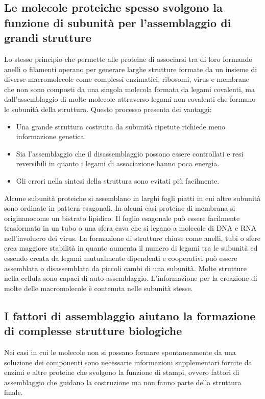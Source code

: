 \subsection{Le molecole proteiche spesso svolgono la funzione di subunit\`a per l'assemblaggio di grandi strutture}
Lo stesso principio che permette alle proteine di associarsi tra di loro formando anelli o filamenti operano per generare larghe strutture formate da un insieme di diverse macromolecole
come complessi enzimatici, ribosomi, virus e membrane che non sono composti da una singola molecola formata da legami covalenti, ma dall'assemblaggio di molte molecole attraverso legami
non covalenti che formano le subunit\`a della struttura. Questo processo presenta dei vantaggi:
\begin{itemize}
	\item Una grande struttura costruita da subunit\`a ripetute richiede meno informazione genetica.
	\item Sia l'assemblaggio che il disassemblaggio possono essere controllati e resi reversibili in quanto i legami di associazione hanno poca energia.
	\item Gli errori nella sintesi della struttura sono evitati pi\`u facilmente. 
\end{itemize}
Alcune subunit\`a proteiche si assemblano in larghi fogli piatti in cui altre subunit\`a sono ordinate in pattern esagonali. In alcuni casi proteine di membrana si originanocome un
bistrato lipidico. Il foglio esagonale pu\`o essere facilmente trasformato in un tubo o una sfera cava che si legano a molecole di DNA e RNA nell'involucro dei virus. La formazione
di strutture chiuse come anelli, tubi o sfere crea maggiore stabilit\`a in quanto aumenta il numero di legami tra le subunit\`a ed essendo creata da legami mutualmente dipendenti e 
cooperativi pu\`o essere assemblata o disassemblata da piccoli cambi di una subunit\`a. Molte strutture nella cellula sono capaci di auto-assemblaggio. L'informazione per la creazione di
molte delle macromolecole \`e contenuta nelle subunit\`a stesse. 
\subsection{I fattori di assemblaggio aiutano la formazione di complesse strutture biologiche}
Nei casi in cui le molecole non si possano formare spontaneamente da una soluzione dei componenti sono necessarie informazioni supplementari fornite da enzimi e altre proteine che 
svolgono la funzione di stampi, ovvero fattori di assemblaggio che guidano la costruzione ma non fanno parte della struttura finale. 
